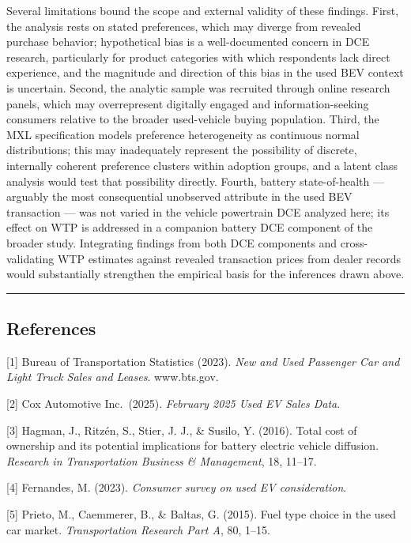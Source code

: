 \documentclass[
  letterpaper,
  DIV=11,
  numbers=noendperiod]{scrartcl}
\begin{document}
Several limitations bound the scope and external validity of these
findings. First, the analysis rests on stated preferences, which may
diverge from revealed purchase behavior; hypothetical bias is a
well-documented concern in DCE research, particularly for product
categories with which respondents lack direct experience, and the
magnitude and direction of this bias in the used BEV context is
uncertain. Second, the analytic sample was recruited through online
research panels, which may overrepresent digitally engaged and
information-seeking consumers relative to the broader used-vehicle
buying population. Third, the MXL specification models preference
heterogeneity as continuous normal distributions; this may inadequately
represent the possibility of discrete, internally coherent preference
clusters within adoption groups, and a latent class analysis would test
that possibility directly. Fourth, battery state-of-health --- arguably
the most consequential unobserved attribute in the used BEV transaction
--- was not varied in the vehicle powertrain DCE analyzed here; its
effect on WTP is addressed in a companion battery DCE component of the
broader study. Integrating findings from both DCE components and
cross-validating WTP estimates against revealed transaction prices from
dealer records would substantially strengthen the empirical basis for
the inferences drawn above.

\begin{center}\rule{0.5\linewidth}{0.5pt}\end{center}

\subsection{References}\label{references}

{[}1{]} Bureau of Transportation Statistics (2023). \emph{New and Used
Passenger Car and Light Truck Sales and Leases}. www.bts.gov.

{[}2{]} Cox Automotive Inc.~(2025). \emph{February 2025 Used EV Sales
Data}.

{[}3{]} Hagman, J., Ritzén, S., Stier, J. J., \& Susilo, Y. (2016).
Total cost of ownership and its potential implications for battery
electric vehicle diffusion. \emph{Research in Transportation Business \&
Management}, 18, 11--17.

{[}4{]} Fernandes, M. (2023). \emph{Consumer survey on used EV
consideration}.

{[}5{]} Prieto, M., Caemmerer, B., \& Baltas, G. (2015). Fuel type
choice in the used car market. \emph{Transportation Research Part A},
80, 1--15.
\end{document}
